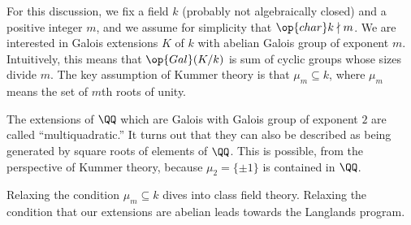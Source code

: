 \documentclass[../notes.tex]{subfiles}
\begin{document}
For this discussion, we fix a field $k$ (probably not algebraically closed) and a positive integer $m$, and we assume for simplicity that $\op{char}k\nmid m$. We are interested in Galois extensions $K$ of $k$ with abelian Galois group of exponent $m$. Intuitively, this means that $\op{Gal}(K/k)$ is sum of cyclic groups whose sizes divide $m$. The key assumption of Kummer theory is that $\mu_m\subseteq k$, where $\mu_m$ means the set of $m$th roots of unity.
\begin{example}
	The extensions of $\QQ$ which are Galois with Galois group of exponent $2$ are called ``multiquadratic.'' It turns out that they can also be described as being generated by square roots of elements of $\QQ$. This is possible, from the perspective of Kummer theory, because $\mu_2=\{\pm1\}$ is contained in $\QQ$.
\end{example}
\begin{remark}
	Relaxing the condition $\mu_m\subseteq k$ dives into class field theory. Relaxing the condition that our extensions are abelian leads towards the Langlands program.
\end{remark}
\end{document}
